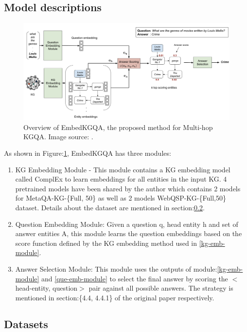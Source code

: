 \subsection{Model descriptions}

\begin{figure}
  \centering
  \includegraphics[width=\textwidth]{../openreview/model.png}
  \caption{Overview of EmbedKGQA, the  proposed method for Multi-hop KGQA. Image source:  \cite{saxena-etal-2020-improving}.
}
  \label{model-figure}
\end{figure}


As shown in Figure:\ref{model-figure}, 
EmbedKGQA has three modules: 
\begin{enumerate}
    \item KG Embedding Module\label{kg-emb-module} - This module contains a KG embedding model called ComplEx \cite{ComplEx2016} to learn embeddings for all entities in the input KG. 4 pretrained models have been shared by the author which contains 2 models for MetaQA-KG-\{Full, 50\} as well as 2 models WebQSP-KG-\{Full,50\} dataset. Details about the dataset are mentioned in section:\ref{sec:datasets}.
\item Question Embedding Module\label{que-emb-module}: Given a question q, head entity h and set
of answer entities A, this module learns the question
embeddings based on the score function defined by the KG embedding method used in \ref{kg-emb-module}. 
\item Answer Selection Module: This module uses the outputs of module:\ref{kg-emb-module} and \ref{que-emb-module} to select the final answer by scoring the $<$head-entity, question$>$
pair against all possible answers. The strategy is mentioned in section:\{4.4, 4.4.1\} of the original paper respectively.
\end{enumerate}

\subsection{Datasets}\label{sec:datasets}


